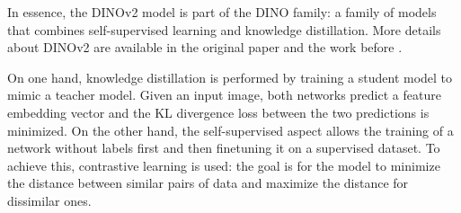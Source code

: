 In essence, the DINOv2 model is part of the DINO family: a family of models that combines self-supervised learning and knowledge distillation.
More details about DINOv2 are available in the original paper \citep{oquab2024dinov2} and the work before \citep{caron2021emerging}.

On one hand, knowledge distillation is performed by training a student model to mimic a teacher model. Given an input image, both networks predict a feature embedding vector and the KL divergence loss between the two predictions is minimized.
On the other hand, the self-supervised aspect allows the training of a network without labels first and then finetuning it on a supervised dataset.
To achieve this, contrastive learning is used: the goal is for the model to minimize the distance between similar pairs of data and maximize the distance for dissimilar ones.

